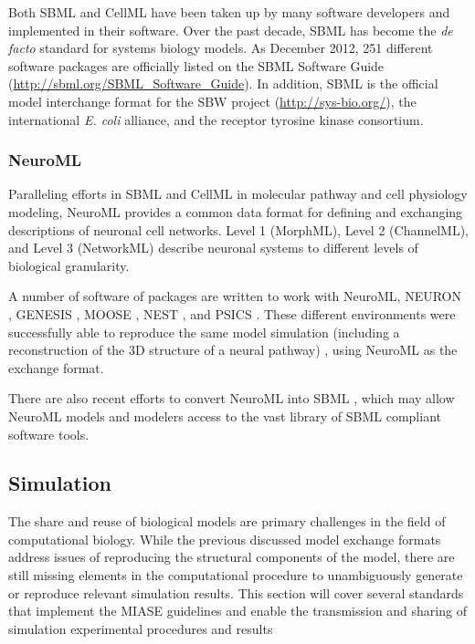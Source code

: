Both SBML and CellML have been taken up by many software developers and
implemented in their software. Over the past decade, SBML has become the
\emph{de facto} standard for systems biology models. As December 2012,
251 different software packages are officially listed on the SBML
Software Guide (\url{http://sbml.org/SBML_Software_Guide}). In addition,
SBML is the official model interchange format for the SBW project
(\url{http://sys-bio.org/}), the international \emph{E. coli} alliance,
and the receptor tyrosine kinase consortium.

\subsubsection{NeuroML}

Paralleling efforts in SBML and CellML in molecular pathway and cell
physiology modeling, NeuroML \autocite{goddard:2001} provides a common
data format for defining and exchanging descriptions of neuronal cell
networks. Level 1 (MorphML), Level 2 (ChannelML), and Level 3
(NetworkML) describe neuronal systems to different levels of biological
granularity.

A number of software of packages are written to work with NeuroML,
NEURON \autocite{carnevale2006neuron}, GENESIS \autocite{bower1995book},
MOOSE \autocite{ray2008pymoose}, NEST \autocite{diesmann2001nest}, and
PSICS \autocite{cannon2010stochastic}. These different environments were
successfully able to reproduce the same model simulation (including a
reconstruction of the 3D structure of a neural pathway)
\autocite{gleeson2010}, using NeuroML as the exchange format.

There are also recent efforts to convert NeuroML into SBML
\autocite{keating2012encoding}, which may allow NeuroML models and
modelers access to the vast library of SBML compliant software tools.

\subsection{Simulation}

The share and reuse of biological models are primary challenges in the
field of computational biology. While the previous discussed model
exchange formats address issues of reproducing the structural components
of the model, there are still missing elements in the computational
procedure to unambiguously generate or reproduce relevant simulation
results. This section will cover several standards that implement the
MIASE guidelines and enable the transmission and sharing of simulation
experimental procedures and results

